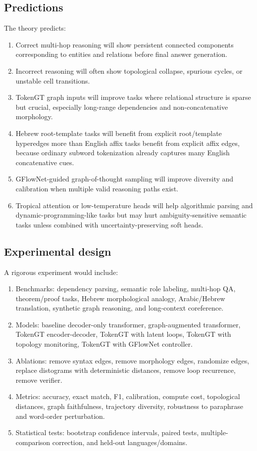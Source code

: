 \documentclass[11pt]{article}
\newcommand{\1}{\mathbf{1}}
\begin{document}
\subsection{Predictions}

The theory predicts:
\begin{enumerate}
\item Correct multi-hop reasoning will show persistent connected components corresponding to entities and relations before final answer generation.
\item Incorrect reasoning will often show topological collapse, spurious cycles, or unstable cell transitions.
\item TokenGT graph inputs will improve tasks where relational structure is sparse but crucial, especially long-range dependencies and non-concatenative morphology.
\item Hebrew root-template tasks will benefit from explicit root/template hyperedges more than English affix tasks benefit from explicit affix edges, because ordinary subword tokenization already captures many English concatenative cues.
\item GFlowNet-guided graph-of-thought sampling will improve diversity and calibration when multiple valid reasoning paths exist.
\item Tropical attention or low-temperature heads will help algorithmic parsing and dynamic-programming-like tasks but may hurt ambiguity-sensitive semantic tasks unless combined with uncertainty-preserving soft heads.
\end{enumerate}

\subsection{Experimental design}

A rigorous experiment would include:
\begin{enumerate}
\item Benchmarks: dependency parsing, semantic role labeling, multi-hop QA, theorem/proof tasks, Hebrew morphological analogy, Arabic/Hebrew translation, synthetic graph reasoning, and long-context coreference.
\item Models: baseline decoder-only transformer, graph-augmented transformer, TokenGT encoder-decoder, TokenGT with latent loops, TokenGT with topology monitoring, TokenGT with GFlowNet controller.
\item Ablations: remove syntax edges, remove morphology edges, randomize edges, replace distograms with deterministic distances, remove loop recurrence, remove verifier.
\item Metrics: accuracy, exact match, F1, calibration, compute cost, topological distances, graph faithfulness, trajectory diversity, robustness to paraphrase and word-order perturbation.
\item Statistical tests: bootstrap confidence intervals, paired tests, multiple-comparison correction, and held-out languages/domains.
\end{enumerate}
\end{document}
